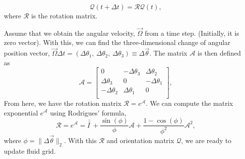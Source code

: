 \begin{equation}
	\mathcal{Q}(t + \Delta t) = \mathcal{R} \mathcal{Q}(t),
\end{equation} 
where $\mathcal{R}$ is the rotation matrix. 
\par
Assume that we obtain the angular velocity, $\vec{\Omega}$ from a time step. (Initially, it is zero vector). With this, we can find the three-dimensional change of angular position vector, $ \vec{\Omega} \Delta t = \left( \Delta \theta_1, \ \Delta \theta_2, \ \Delta \theta_3 \right) \equiv \Delta \vec{\theta}$.
The matrix $\mathcal{A}$ is then defined as 
\begin{equation}
	\mathcal{A}
	=\begin{bmatrix}
	 0 & - \Delta \theta_3 & \Delta \theta_2  \\
	 \Delta \theta_3 & 0  & -\Delta \theta_1  \\
	 - \Delta \theta_2 & \Delta \theta_1 & 0  \\
	\end{bmatrix},
	\label{eq_rotation_mx}
\end{equation}
From here, we have the rotation matrix $\mathcal{R} = e^{\mathcal{A}}.$
We can compute the matrix exponential $e^{\mathcal{A}}$ using Rodrigues' formula,
\begin{equation}
	\mathcal{R} = 
e^{\mathcal{A}} 
 = \bar{\bar{I \ }} 
 + \frac{\sin(\phi)}{\phi} \mathcal{A}
 + \frac{1-\cos(\phi)}{\phi^2} \mathcal{A}^2,
\label{eq_R_eA}
\end{equation} 
where $\phi = \|\Delta \vec{\theta}\|_2$.
With this $\mathcal{R}$ and orientation matrix $\mathcal{Q}$, we are ready to update fluid grid.


	
